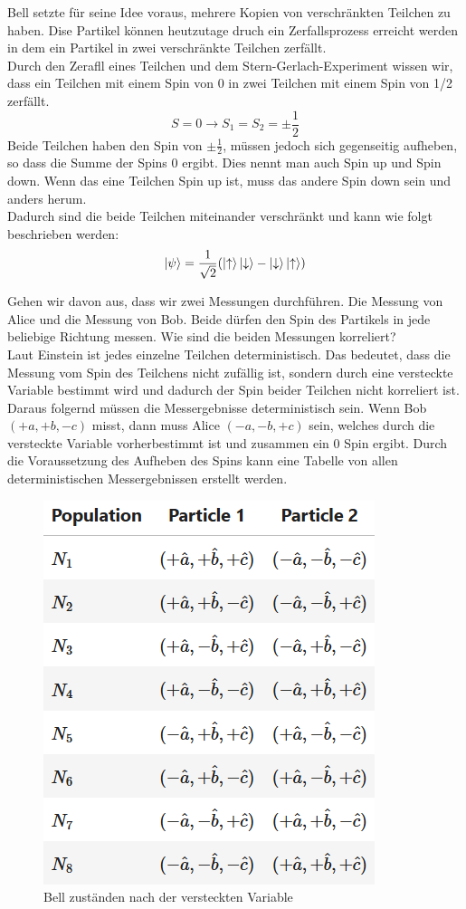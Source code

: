 Bell setzte für seine Idee voraus, mehrere Kopien von verschränkten Teilchen zu haben. Dise Partikel können heutzutage druch ein Zerfallsprozess erreicht werden in dem ein Partikel in zwei verschränkte Teilchen zerfällt.\\

Durch den Zerafll eines Teilchen und dem Stern-Gerlach-Experiment wissen wir, dass ein Teilchen mit einem Spin von 0 in zwei Teilchen mit einem Spin von 1/2 zerfällt.
\begin{equation}
    S = 0 \rightarrow S_1 = S_2 = \pm\frac{1}{2}
\end{equation}
Beide Teilchen haben den Spin von $\pm\frac{1}{2}$, müssen jedoch sich gegenseitig aufheben, so dass die Summe der Spins 0 ergibt.
Dies nennt man auch Spin up und Spin down. Wenn das eine Teilchen Spin up ist, muss das andere Spin down sein und anders herum.\\
Dadurch sind die beide Teilchen miteinander verschränkt und kann wie folgt beschrieben werden:
\begin{equation}
    \ket{\psi} = \frac{1}{\sqrt{2}}(\ket{\uparrow}\ket{\downarrow} - \ket{\downarrow}\ket{\uparrow})
\end{equation}

Gehen wir davon aus, dass wir zwei Messungen durchführen. Die Messung von Alice und die Messung von Bob.
Beide dürfen den Spin des Partikels in jede beliebige Richtung messen. Wie sind die beiden Messungen korreliert?\\
Laut Einstein ist jedes einzelne Teilchen deterministisch. Das bedeutet, dass die Messung vom Spin des Teilchens nicht zufällig ist, sondern durch eine versteckte Variable bestimmt wird und dadurch der Spin beider Teilchen nicht korreliert ist.\\
Daraus folgernd müssen die Messergebnisse deterministisch sein. Wenn Bob $(+a, +b, -c)$ misst, dann muss Alice $(-a, -b, +c)$ sein, welches durch die versteckte Variable vorherbestimmt ist und zusammen ein 0 Spin ergibt.
Durch die Voraussetzung des Aufheben des Spins kann eine Tabelle von allen deterministischen Messergebnissen erstellt werden.

\begin{figure}[H]
    \centering
    \includegraphics[width=0.5\linewidth]{img/BellList.png}
    \caption{Bell zuständen nach der versteckten Variable}
    \label{fig:BellList}
\end{figure}

